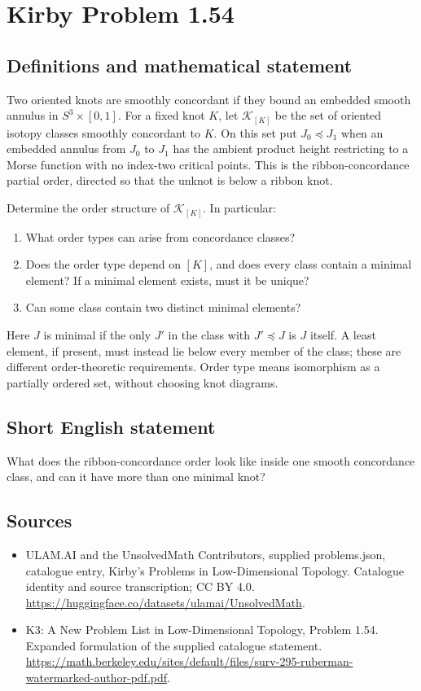 \documentclass[11pt,a4paper]{article}
\begin{document}
\section*{Kirby Problem 1.54}\label{statement}

\subsection{Definitions and mathematical statement}
Two oriented knots are smoothly concordant if they bound an embedded smooth
annulus in $S^3\times[0,1]$. For a fixed knot $K$, let $\mathscr K_{[K]}$ be the
set of oriented isotopy classes smoothly concordant to $K$.
On this set put $J_0\preceq J_1$ when an embedded annulus from $J_0$ to $J_1$
has the ambient product height restricting to a Morse function with no
index-two critical points. This is the ribbon-concordance
partial order, directed so that the unknot is below a ribbon knot.

Determine the order structure of $\mathscr K_{[K]}$. In particular:
\begin{enumerate}
\item What order types can arise from concordance classes?
\item Does the order type depend on $[K]$, and does every class contain a minimal
element? If a minimal element exists, must it be unique?
\item Can some class contain two distinct minimal elements?
\end{enumerate}
Here $J$ is minimal if the only $J'$ in the class with $J'\preceq J$ is $J$
itself. A least element, if present, must instead lie below every member of the
class; these are different order-theoretic requirements. Order type means
isomorphism as a partially ordered set, without choosing knot diagrams.
\subsection{Short English statement}
What does the ribbon-concordance order look like inside one smooth concordance class, and can it have more than one minimal knot?
\subsection{Sources}
\begin{itemize}
\item[S1] ULAM.AI and the UnsolvedMath Contributors, supplied problems.json, catalogue entry, Kirby's Problems in Low-Dimensional Topology. Catalogue identity and source transcription; CC BY 4.0.
\url{https://huggingface.co/datasets/ulamai/UnsolvedMath}.
\item[S2] K3: A New Problem List in Low-Dimensional Topology, Problem 1.54. Expanded formulation of the supplied catalogue statement.
\url{https://math.berkeley.edu/sites/default/files/surv-295-ruberman-watermarked-author-pdf.pdf}.
\end{itemize}
\end{document}
